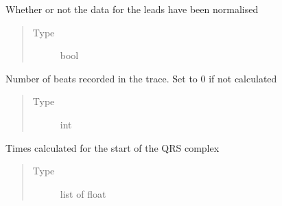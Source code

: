 \documentclass[letterpaper,10pt,english]{sphinxmanual}
\begin{document}
\begin{fulllineitems}
\begin{fulllineitems}
\begin{quote}
\begin{description}
\end{description}\end{quote}

\end{fulllineitems}


\begin{fulllineitems}
\label{\detokenize{_autosummary/signalanalysis.ecg.Ecg:signalanalysis.ecg.Ecg.normalised}}
\sphinxAtStartPar
Whether or not the data for the leads have been normalised
\begin{quote}\begin{description}
\item[{Type}] \leavevmode
\sphinxAtStartPar
bool

\end{description}\end{quote}

\end{fulllineitems}


\begin{fulllineitems}
\label{\detokenize{_autosummary/signalanalysis.ecg.Ecg:signalanalysis.ecg.Ecg.n_beats}}
\sphinxAtStartPar
Number of beats recorded in the trace. Set to 0 if not calculated
\begin{quote}\begin{description}
\item[{Type}] \leavevmode
\sphinxAtStartPar
int

\end{description}\end{quote}

\end{fulllineitems}


\begin{fulllineitems}
\label{\detokenize{_autosummary/signalanalysis.ecg.Ecg:signalanalysis.ecg.Ecg.qrs_start}}
\sphinxAtStartPar
Times calculated for the start of the QRS complex
\begin{quote}\begin{description}
\item[{Type}] \leavevmode
\sphinxAtStartPar
list of float


\end{description}
\end{quote}
\end{fulllineitems}
\end{fulllineitems}
\end{document}
